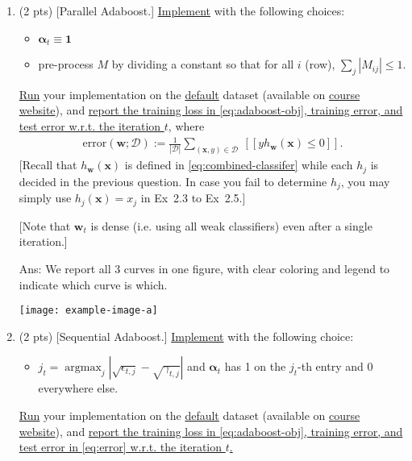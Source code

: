 \documentclass[10pt,letter,notitlepage]{article}
\newcommand{\wv}{\mathbf{w}}
\newcommand{\xv}{\mathbf{x}}
\newcommand{\Dc}{\mathcal{D}}
\newcommand{\alphav}{\boldsymbol{\alpha}}
\newcommand{\ans}[1]{{\color{blue}\textsf{Ans}: #1}}
\newcommand{\argmax}{\mathop{\mathrm{argmax}}}
\newcommand{\one}{\mathbf{1}}
\newcommand{\pred}[1]{[\![#1]\!]}
\begin{document}
\begin{exercise}
\begin{enumerate}
		\item (2 pts) [Parallel Adaboost.] \uline{Implement}  with the following choices: 
		\begin{itemize}
		\item $\alphav_t \equiv \one$
		\item pre-process $M$ by dividing a constant so that for all $i$ (row), $\sum_j |M_{ij}| \leq 1$.
		\end{itemize}
		\uline{Run} your implementation on the \href{https://archive.ics.uci.edu/ml/datasets/default+of+credit+card+clients}{default} dataset (available on \href{https://cs.uwaterloo.ca/~y328yu/mycourses/480/assignment.html}{course website}), and \uline{report the training loss in \eqref{eq:adaboost-obj}, training error, and test error w.r.t. the iteration $t$,} where 
		\begin{align}
			\label{eq:error}
			\mathrm{error}(\wv; \Dc) := \frac{1}{|\Dc|}\sum_{ (\xv, y) \in \Dc} ~\pred{y h_{\wv}(\xv) \leq 0}.
		\end{align}
		[Recall that $h_\wv(\xv)$ is defined in \eqref{eq:combined-classifer} while each $h_j$ is decided in the previous question. In case you fail to determine $h_j$, you may simply use $h_j(\xv) = x_j$ in Ex~2.3 to Ex~2.5.]
		
		[Note that $\wv_t$ is dense (i.e. using all weak classifiers) even after a single iteration.]
		
		\ans{%
		We report all 3 curves in one figure, with clear coloring and legend to indicate which curve is which.
		\begin{center}
			\texttt{[image: example-image-a]}
		\end{center}
		}
		
		\item (2 pts) [Sequential Adaboost.]  \uline{Implement}  with the following choice: 
		\begin{itemize}
		\item $j_t = \argmax_j | \sqrt{\epsilon_{t,j}} - \sqrt{\gamma_{t,j}} |$ and $\alphav_t$ has 1 on the $j_t$-th entry and 0 everywhere else. 
		\end{itemize}
		\uline{Run} your implementation on the \href{https://archive.ics.uci.edu/ml/datasets/default+of+credit+card+clients}{default} dataset (available on \href{https://cs.uwaterloo.ca/~y328yu/mycourses/480/assignment.html}{course website}), and \uline{report the training loss in \eqref{eq:adaboost-obj}, training error, and test error in \eqref{eq:error} w.r.t. the iteration $t$.}
		

\end{enumerate}
\end{exercise}
\end{document}
